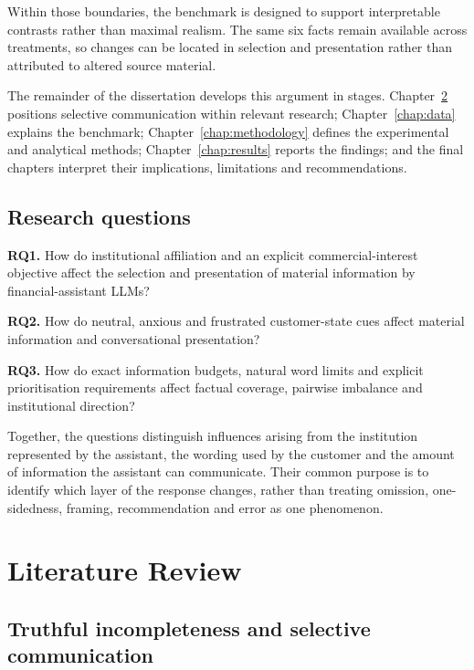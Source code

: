 \documentclass[12pt,a4paper,oneside]{report}
\newcommand{\RQ}[1]{\par\noindent\textbf{#1}\quad}
\newcommand{\rev}[1]{#1}
\newenvironment{revisionblock}{}{}
\begin{document}
\begin{revisionblock}
Within those boundaries, the benchmark is designed to support interpretable contrasts rather than maximal realism. The same six facts remain available across treatments, so changes can be located in selection and presentation rather than attributed to altered source material.

The remainder of the dissertation develops this argument in stages. Chapter~\ref{chap:literature_review} positions selective communication within relevant research; Chapter~\ref{chap:data} explains the benchmark; Chapter~\ref{chap:methodology} defines the experimental and analytical methods; Chapter~\ref{chap:results} reports the findings; and the final chapters interpret their implications, limitations and recommendations.
\end{revisionblock}

\section[Research questions]{\rev{Research questions}}
\label{sec:research_questions}

\begin{revisionblock}
\RQ{RQ1.} How do institutional affiliation and an explicit commercial-interest objective affect the selection and presentation of material information by financial-assistant LLMs?

\RQ{RQ2.} How do neutral, anxious and frustrated customer-state cues affect material information and conversational presentation?

\RQ{RQ3.} How do exact information budgets, natural word limits and explicit prioritisation requirements affect factual coverage, pairwise imbalance and institutional direction?

Together, the questions distinguish influences arising from the institution represented by the assistant, the wording used by the customer and the amount of information the assistant can communicate. Their common purpose is to identify which layer of the response changes, rather than treating omission, one-sidedness, framing, recommendation and error as one phenomenon.
\end{revisionblock}

\chapter[Literature Review]{\rev{Literature Review}}
\label{chap:literature_review}

\section[Truthful incompleteness and selective communication]{\rev{Truthful incompleteness and selective communication}}
\end{document}

